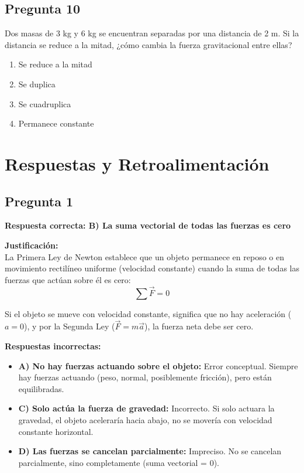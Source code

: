 \begin{preguntabox}
\subsection{Pregunta 10}
Dos masas de 3 kg y 6 kg se encuentran separadas por una distancia de 2 m. Si la distancia se reduce a la mitad, ¿cómo cambia la fuerza gravitacional entre ellas?

\begin{enumerate}
    \item[A)] Se reduce a la mitad
    \item[B)] Se duplica
    \item[C)] Se cuadruplica
    \item[D)] Permanece constante
\end{enumerate}
\end{preguntabox}

\newpage
\onecolumn
\section{Respuestas y Retroalimentación}

\begin{respuestabox}
\subsection{Pregunta 1}
\textcolor{verdecorrecto}{\textbf{Respuesta correcta: B) La suma vectorial de todas las fuerzas es cero}}

\textbf{Justificación:}\\
La Primera Ley de Newton establece que un objeto permanece en reposo o en movimiento rectilíneo uniforme (velocidad constante) cuando la suma de todas las fuerzas que actúan sobre él es cero:
$$\sum \vec{F} = 0$$

Si el objeto se mueve con velocidad constante, significa que no hay aceleración ($a = 0$), y por la Segunda Ley ($\vec{F} = m\vec{a}$), la fuerza neta debe ser cero.

\textbf{Respuestas incorrectas:}
\begin{itemize}
    \item \textbf{A) No hay fuerzas actuando sobre el objeto:} Error conceptual. Siempre hay fuerzas actuando (peso, normal, posiblemente fricción), pero están equilibradas.
    \item \textbf{C) Solo actúa la fuerza de gravedad:} Incorrecto. Si solo actuara la gravedad, el objeto aceleraría hacia abajo, no se movería con velocidad constante horizontal.
    \item \textbf{D) Las fuerzas se cancelan parcialmente:} Impreciso. No se cancelan parcialmente, sino completamente (suma vectorial = 0).
\end{itemize}
\end{respuestabox}

